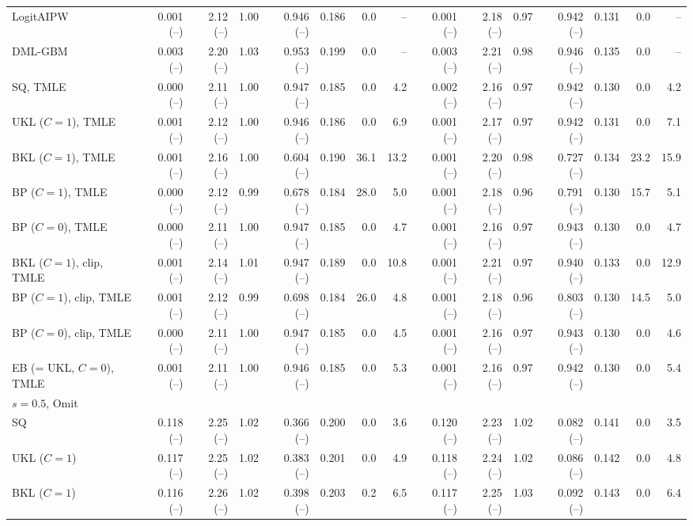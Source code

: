 \begin{tabular}{lrrrrrrrrrrrrrr}
LogitAIPW & 0.001 (--) & 2.12 (--) & 1.00 & 0.946 (--) & 0.186 & 0.0 & -- & 0.001 (--) & 2.18 (--) & 0.97 & 0.942 (--) & 0.131 & 0.0 & -- \\
DML-GBM & 0.003 (--) & 2.20 (--) & 1.03 & 0.953 (--) & 0.199 & 0.0 & -- & 0.003 (--) & 2.21 (--) & 0.98 & 0.946 (--) & 0.135 & 0.0 & -- \\
SQ, TMLE & 0.000 (--) & 2.11 (--) & 1.00 & 0.947 (--) & 0.185 & 0.0 & 4.2 & 0.002 (--) & 2.16 (--) & 0.97 & 0.942 (--) & 0.130 & 0.0 & 4.2 \\
UKL ($C=1$), TMLE & 0.001 (--) & 2.12 (--) & 1.00 & 0.946 (--) & 0.186 & 0.0 & 6.9 & 0.001 (--) & 2.17 (--) & 0.97 & 0.942 (--) & 0.131 & 0.0 & 7.1 \\
BKL ($C=1$), TMLE & 0.001 (--) & 2.16 (--) & 1.00 & 0.604 (--) & 0.190 & 36.1 & 13.2 & 0.001 (--) & 2.20 (--) & 0.98 & 0.727 (--) & 0.134 & 23.2 & 15.9 \\
BP ($C=1$), TMLE & 0.000 (--) & 2.12 (--) & 0.99 & 0.678 (--) & 0.184 & 28.0 & 5.0 & 0.001 (--) & 2.18 (--) & 0.96 & 0.791 (--) & 0.130 & 15.7 & 5.1 \\
BP ($C=0$), TMLE & 0.000 (--) & 2.11 (--) & 1.00 & 0.947 (--) & 0.185 & 0.0 & 4.7 & 0.001 (--) & 2.16 (--) & 0.97 & 0.943 (--) & 0.130 & 0.0 & 4.7 \\
BKL ($C=1$), clip, TMLE & 0.001 (--) & 2.14 (--) & 1.01 & 0.947 (--) & 0.189 & 0.0 & 10.8 & 0.001 (--) & 2.21 (--) & 0.97 & 0.940 (--) & 0.133 & 0.0 & 12.9 \\
BP ($C=1$), clip, TMLE & 0.001 (--) & 2.12 (--) & 0.99 & 0.698 (--) & 0.184 & 26.0 & 4.8 & 0.001 (--) & 2.18 (--) & 0.96 & 0.803 (--) & 0.130 & 14.5 & 5.0 \\
BP ($C=0$), clip, TMLE & 0.000 (--) & 2.11 (--) & 1.00 & 0.947 (--) & 0.185 & 0.0 & 4.5 & 0.001 (--) & 2.16 (--) & 0.97 & 0.943 (--) & 0.130 & 0.0 & 4.6 \\
EB (= UKL, $C=0$), TMLE & 0.001 (--) & 2.11 (--) & 1.00 & 0.946 (--) & 0.185 & 0.0 & 5.3 & 0.001 (--) & 2.16 (--) & 0.97 & 0.942 (--) & 0.130 & 0.0 & 5.4 \\
\multicolumn{15}{l}{$s=0.5$, Omit} \\
SQ & 0.118 (--) & 2.25 (--) & 1.02 & 0.366 (--) & 0.200 & 0.0 & 3.6 & 0.120 (--) & 2.23 (--) & 1.02 & 0.082 (--) & 0.141 & 0.0 & 3.5 \\
UKL ($C=1$) & 0.117 (--) & 2.25 (--) & 1.02 & 0.383 (--) & 0.201 & 0.0 & 4.9 & 0.118 (--) & 2.24 (--) & 1.02 & 0.086 (--) & 0.142 & 0.0 & 4.8 \\
BKL ($C=1$) & 0.116 (--) & 2.26 (--) & 1.02 & 0.398 (--) & 0.203 & 0.2 & 6.5 & 0.117 (--) & 2.25 (--) & 1.03 & 0.092 (--) & 0.143 & 0.0 & 6.4 \\

\end{tabular}
